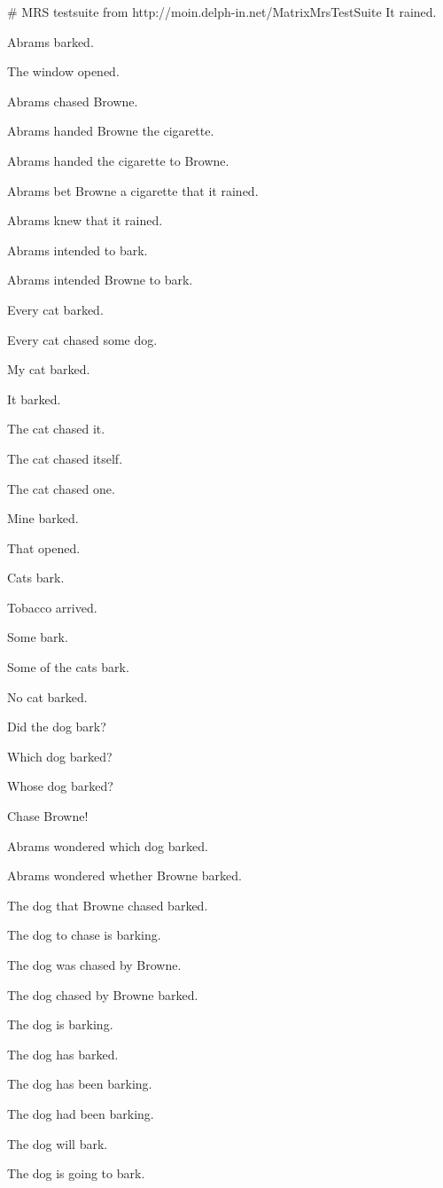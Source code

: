 # MRS testsuite from http://moin.delph-in.net/MatrixMrsTestSuite
It rained.

Abrams barked.

The window opened.

Abrams chased Browne.

Abrams handed Browne the cigarette.

Abrams handed the cigarette to Browne.

Abrams bet Browne a cigarette that it rained.

Abrams knew that it rained.

Abrams intended to bark.

Abrams intended Browne to bark.

Every cat barked.

Every cat chased some dog.

My cat barked.

It barked.

The cat chased it.

The cat chased itself.

The cat chased one.

Mine barked.

That opened.

Cats bark.

Tobacco arrived.

Some bark.

Some of the cats bark.

No cat barked.

Did the dog bark?

Which dog barked?

Whose dog barked?

Chase Browne!

Abrams wondered which dog barked.

Abrams wondered whether Browne barked.

The dog that Browne chased barked.

The dog to chase is barking.

The dog was chased by Browne.

The dog chased by Browne barked.

The dog is barking.

The dog has barked.

The dog has been barking.

The dog had been barking.

The dog will bark.

The dog is going to bark.

